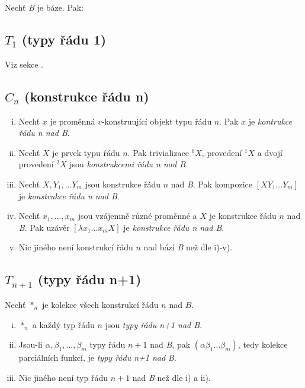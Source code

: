 Nechť \textit{B} je báze. Pak:

\subsection{$T_1$ (typy řádu 1)}
Viz sekce .

\subsection{$C_n$ (konstrukce řádu n)}

\begin{enumerate}[i)]
    \item Nechť $x$ je proměnná $v$-konstruující objekt typu řádu $n$. Pak $x$ je
        \textit{kontrukce řádu n nad B}.
    \item Nechť $X$ je prvek typu řádu $n$. Pak trivializace ${}^0X$, provedení ${}^1X$ a dvojí
        provedení ${}^2X$ jsou \textit{konstrukcemi řádu n nad B}.
    \item Nechť $X, Y_1, ... Y_m$ jsou konstrukce řádu $n$ nad \textit{B}. Pak kompozice 
        $[X Y_1...Y_m]$ je \textit{konstrukce řádu n nad B}.
    \item Nechť $x_1,...,x_m$ jsou vzájemně různé proměnné a $X$ je konstrukce řádu $n$
        nad \textit{B}. Pak uzávěr $[\lambda x_1 ... x_m X]$ je \textit{konstrukce řádu n nad B}.
    \item Nic jiného není konstrukcí řádu $n$ nad bází \textit{B} než dle i)-v).
\end{enumerate}

\subsection{$T_{n+1}$ (typy řádu n+1)}

Nechť $*_n$ je kolekce všech konstrukcí řádu $n$ nad $B$.

\begin{enumerate}[i)]
    \item $*_n$ a každý typ řádu $n$ jsou \textit{typy řádu n+1 nad B}.
    \item Jsou-li $\alpha, \beta_1,...,\beta_m$ typy řádu $n+1$ nad \textit{B}, pak
        $(\alpha \beta_1...\beta_m)$, tedy kolekce parciálních funkcí, je
        \textit{typy řádu n+1 nad B}.
    \item Nic jiného není typ řádu $n+1$ nad \textit{B} než dle i) a ii).
\end{enumerate}

